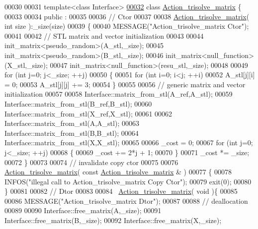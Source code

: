 \begin{DoxyCode}
00030 
00031 \textcolor{keyword}{template}<\textcolor{keyword}{class} Interface>
\hyperlink{class_action__trisolve__matrix}{00032} \textcolor{keyword}{class }\hyperlink{class_action__trisolve__matrix}{Action\_trisolve\_matrix} \{
00033 
00034 public :
00035 
00036   \textcolor{comment}{// Ctor}
00037 
00038   \hyperlink{class_action__trisolve__matrix}{Action\_trisolve\_matrix}( \textcolor{keywordtype}{int} size ):\_size(size)
00039   \{
00040     MESSAGE(\textcolor{stringliteral}{"Action\_trisolve\_matrix Ctor"});
00041 
00042     \textcolor{comment}{// STL matrix and vector initialization}
00043 
00044     init\_matrix<pseudo\_random>(A\_stl,\_size);
00045     init\_matrix<pseudo\_random>(B\_stl,\_size);
00046     init\_matrix<null\_function>(X\_stl,\_size);
00047     init\_matrix<null\_function>(resu\_stl,\_size);
00048 
00049     \textcolor{keywordflow}{for} (\textcolor{keywordtype}{int} j=0; j<\_size; ++j)
00050     \{
00051       \textcolor{keywordflow}{for} (\textcolor{keywordtype}{int} i=0; i<j; ++i)
00052         A\_stl[j][i] = 0;
00053       A\_stl[j][j] += 3;
00054     \}
00055 
00056     \textcolor{comment}{// generic matrix and vector initialization}
00057 
00058     Interface::matrix\_from\_stl(A\_ref,A\_stl);
00059     Interface::matrix\_from\_stl(B\_ref,B\_stl);
00060     Interface::matrix\_from\_stl(X\_ref,X\_stl);
00061 
00062     Interface::matrix\_from\_stl(A,A\_stl);
00063     Interface::matrix\_from\_stl(B,B\_stl);
00064     Interface::matrix\_from\_stl(X,X\_stl);
00065 
00066     \_cost = 0;
00067     \textcolor{keywordflow}{for} (\textcolor{keywordtype}{int} j=0; j<\_size; ++j)
00068     \{
00069       \_cost += 2*j + 1;
00070     \}
00071     \_cost *= \_size;
00072   \}
00073 
00074   \textcolor{comment}{// invalidate copy ctor}
00075 
00076   \hyperlink{class_action__trisolve__matrix}{Action\_trisolve\_matrix}( \textcolor{keyword}{const}  \hyperlink{class_action__trisolve__matrix}{Action\_trisolve\_matrix} & )
00077   \{
00078     INFOS(\textcolor{stringliteral}{"illegal call to Action\_trisolve\_matrix Copy Ctor"});
00079     exit(0);
00080   \}
00081 
00082   \textcolor{comment}{// Dtor}
00083 
00084   ~\hyperlink{class_action__trisolve__matrix}{Action\_trisolve\_matrix}( \textcolor{keywordtype}{void} )\{
00085 
00086     MESSAGE(\textcolor{stringliteral}{"Action\_trisolve\_matrix Dtor"});
00087 
00088     \textcolor{comment}{// deallocation}
00089 
00090     Interface::free\_matrix(A,\_size);
00091     Interface::free\_matrix(B,\_size);
00092     Interface::free\_matrix(X,\_size);

\end{DoxyCode}
